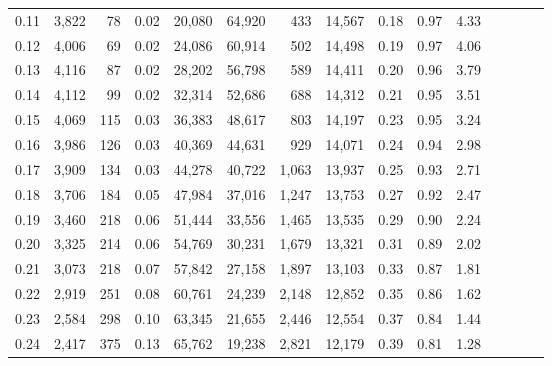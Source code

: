 \begin{tabular}{rrrcrrrrrrrrrrr}
0.11 &  3,822 &   78 &                                       0.02 &  20,080 &  64,920 &     433 &  14,567 &  0.18 &  0.97 &                         4.33 \\
0.12 &  4,006 &   69 &                                       0.02 &  24,086 &  60,914 &     502 &  14,498 &  0.19 &  0.97 &                         4.06 \\
0.13 &  4,116 &   87 &                                       0.02 &  28,202 &  56,798 &     589 &  14,411 &  0.20 &  0.96 &                         3.79 \\
0.14 &  4,112 &   99 &                                       0.02 &  32,314 &  52,686 &     688 &  14,312 &  0.21 &  0.95 &                         3.51 \\
0.15 &  4,069 &  115 &                                       0.03 &  36,383 &  48,617 &     803 &  14,197 &  0.23 &  0.95 &                         3.24 \\
0.16 &  3,986 &  126 &                                       0.03 &  40,369 &  44,631 &     929 &  14,071 &  0.24 &  0.94 &                         2.98 \\
0.17 &  3,909 &  134 &                                       0.03 &  44,278 &  40,722 &   1,063 &  13,937 &  0.25 &  0.93 &                         2.71 \\
0.18 &  3,706 &  184 &                                       0.05 &  47,984 &  37,016 &   1,247 &  13,753 &  0.27 &  0.92 &                         2.47 \\
0.19 &  3,460 &  218 &                                       0.06 &  51,444 &  33,556 &   1,465 &  13,535 &  0.29 &  0.90 &                         2.24 \\
0.20 &  3,325 &  214 &                                       0.06 &  54,769 &  30,231 &   1,679 &  13,321 &  0.31 &  0.89 &                         2.02 \\
0.21 &  3,073 &  218 &                                       0.07 &  57,842 &  27,158 &   1,897 &  13,103 &  0.33 &  0.87 &                         1.81 \\
0.22 &  2,919 &  251 &                                       0.08 &  60,761 &  24,239 &   2,148 &  12,852 &  0.35 &  0.86 &                         1.62 \\
0.23 &  2,584 &  298 &                                       0.10 &  63,345 &  21,655 &   2,446 &  12,554 &  0.37 &  0.84 &                         1.44 \\
0.24 &  2,417 &  375 &                                       0.13 &  65,762 &  19,238 &   2,821 &  12,179 &  0.39 &  0.81 &                         1.28 \\

\end{tabular}
